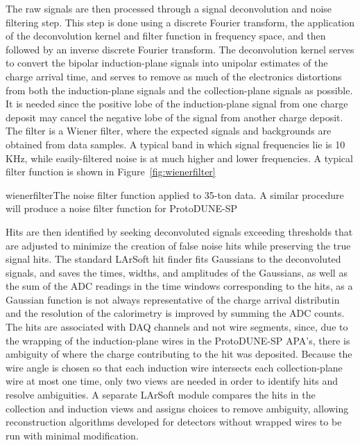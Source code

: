 The raw signals are then processed through a signal deconvolution and
noise filtering step.  This step is done using a discrete Fourier
transform, the application of the deconvolution kernel and filter
function in frequency space, and then followed by an inverse discrete
Fourier transform.  The deconvolution kernel serves to convert the
bipolar induction-plane signals into unipolar estimates of the charge
arrival time, and serves to remove as much of the electronics
distortions from both the induction-plane signals and the
collection-plane signals as possible.  It is needed since the positive
lobe of the induction-plane signal from one charge deposit may cancel
the negative lobe of the signal from another charge deposit.  The
filter is a Wiener filter, where the expected signals and backgrounds
are obtained from data samples.  A typical band in which signal
frequencies lie is 10 KHz, while easily-filtered noise is at much
higher and lower frequencies.  A typical filter function is shown in
Figure~\ref{fig:wienerfilter}

\begin{cdrfigure}{wienerfilter}{The noise filter function applied to 35-ton data.  A similar procedure will produce a noise filter function for ProtoDUNE-SP}
\end{cdrfigure}

Hits are then identified by seeking deconvoluted signals exceeding
thresholds that are adjusted to minimize the creation of false noise
hits while preserving the true signal hits.  The standard LArSoft hit
finder fits Gaussians to the deconvoluted signals, and saves the
times, widths, and amplitudes of the Gaussians, as well as the sum of
the ADC readings in the time windows corresponding to the hits, as a
Gaussian function is not always representative of the charge arrival
distributin and the resolution of the calorimetry is improved by
summing the ADC counts.  The hits are associated with DAQ channels and
not wire segments, since, due to the wrapping of the induction-plane
wires in the ProtoDUNE-SP APA's, there is ambiguity of where the
charge contributing to the hit was deposited.  Because the wire angle
is chosen so that each induction wire intersects each collection-plane
wire at most one time, only two views are needed in order to identify
hits and resolve ambiguities.  A separate LArSoft module compares the
hits in the collection and induction views and assigns choices to
remove ambiguity, allowing reconstruction algorithms developed for
detectors without wrapped wires to be run with minimal modification.

